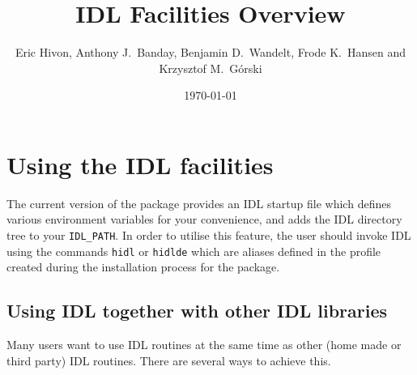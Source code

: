 \documentclass[12pt,twoside]{article}
\begin{document}
\title{\healpix IDL Facilities Overview}
\label{idl:idlxxx}
\author{Eric Hivon, Anthony J.~Banday, Benjamin D.~Wandelt, Frode
K.~Hansen and Krzysztof M.~G\'orski}

\date{\today}

\frontpage
\tableofcontents
\newpage

\section{Using the \healpix IDL facilities}




The current version of the \healpix package provides
an IDL startup file which defines various environment
variables for your convenience, and adds the \healpix
IDL directory tree to your {\tt IDL\_PATH}. In order to utilise
this feature, the user should invoke IDL using the
commands {\tt hidl} or {\tt hidlde} which are aliases defined in the
\healpix profile created during the installation process 
for the package.

\subsection{Using \healpix IDL together with other IDL libraries}
Many users want to use \healpix IDL routines at the same time as other (home made
or third party) IDL routines. There are several ways to achieve this.
\end{document}
